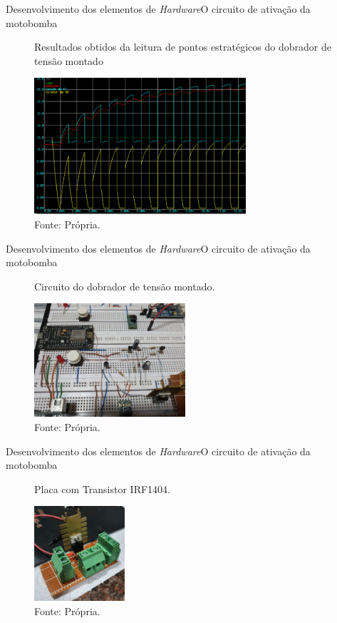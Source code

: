 \begin{frame}{Desenvolvimento dos elementos de \textit{Hardware}}{O circuito de ativação da motobomba}
  \begin{figure}[H]
    \centering
    \caption{Resultados obtidos da leitura de pontos estratégicos do dobrador de tensão montado}
    \includegraphics[width=0.7\textwidth]{figuras/dobrador.png}
    \caption*{\tiny{Fonte: Própria.}}
  \end{figure}
\end{frame}

\begin{frame}{Desenvolvimento dos elementos de \textit{Hardware}}{O circuito de ativação da motobomba}
  \begin{figure}[H]
    \centering
    \caption{Circuito do dobrador de tensão montado.}
    \includegraphics[width=0.5\textwidth]{figuras/dobrador_montado.jpg}
    \caption*{\tiny{Fonte: Própria.}}
    \label{fig:dobrador_montado}
  \end{figure} 
  
\end{frame}

\begin{frame}{Desenvolvimento dos elementos de \textit{Hardware}}{O circuito de ativação da motobomba}
  \begin{figure}[H]
    \centering
    \caption{Placa com Transistor IRF1404.}
    \includegraphics[width=0.3\textwidth]{figuras/transistor_motor.jpg}
    \caption*{\tiny{Fonte: Própria.}}
    \label{fig:dobrador_montado}
  \end{figure} 
  
\end{frame}

